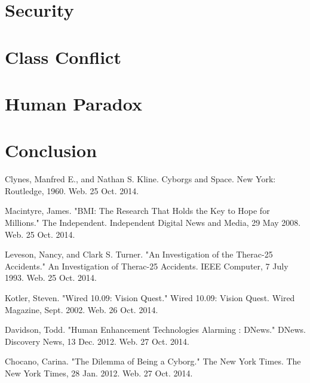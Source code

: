 \documentclass[12pt,a4paper,notitlepage]{article}
\begin{document}
\section{Security}
\section{Class Conflict}
\section{Human Paradox}
\section{Conclusion}

\begin{thebibliography}{9}

Clynes, Manfred E., and Nathan S. Kline. Cyborgs and Space. New York: Routledge, 1960. Web. 25 Oct. 2014.

Macintyre, James. "BMI: The Research That Holds the Key to Hope for Millions." The Independent. Independent Digital News and Media, 29 May 2008. Web. 25 Oct. 2014.

Leveson, Nancy, and Clark S. Turner. "An Investigation of the Therac-25 Accidents." An Investigation of Therac-25 Accidents. IEEE Computer, 7 July 1993. Web. 25 Oct. 2014.

Kotler, Steven. "Wired 10.09: Vision Quest." Wired 10.09: Vision Quest. Wired Magazine, Sept. 2002. Web. 26 Oct. 2014.

Davidson, Todd. "Human Enhancement Technologies Alarming : DNews." DNews. Discovery News, 13 Dec. 2012. Web. 27 Oct. 2014.

Chocano, Carina. "The Dilemma of Being a Cyborg." The New York Times. The New York Times, 28 Jan. 2012. Web. 27 Oct. 2014.

\end{thebibliography}
\end{document}

